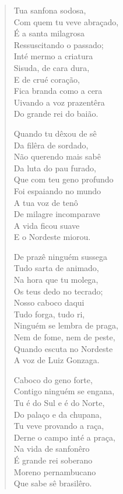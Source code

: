 \begin{verse}
Tua sanfona sodosa,\\
Com quem tu veve abraçado,\\
É a santa milagrosa\\
Ressuscitando o passado;\\
Inté mermo a criatura\\
Sisuda, de cara dura,\\
E de crué coração,\\
Fica branda como a cera\\
Uivando a voz prazentêra\\
Do grande rei do baião.

Quando tu dêxou de sê\\
Da filêra de sordado,\\
Não querendo mais sabê\\
Da luta do pau furado,\\
Que com teu geno profundo\\
Foi espaiando no mundo\\
A tua voz de tenô\\
De milagre incomparave\\
A vida ficou suave\\
E o Nordeste miorou.

De prazê ninguém sussega\\
Tudo sarta de animado,\\
Na hora que tu molega,\\
Os teus dedo no tecrado;\\
Nosso caboco daqui\\
Tudo forga, tudo ri,\\
Ninguém se lembra de praga,\\
Nem de fome, nem de peste,\\
Quando escuta no Nordeste\\
A voz de Luiz Gonzaga.

Caboco do geno forte,\\
Contigo ninguém se engana,\\
Tu é do Sul e é do Norte,\\
Do palaço e da chupana,\\
Tu veve provando a raça,\\
Derne o campo inté a praça,\\
Na vida de sanfonêro\\
É grande rei soberano\\
Moreno pernambucano\\
Que sabe sê brasilêro.
\end{verse}

